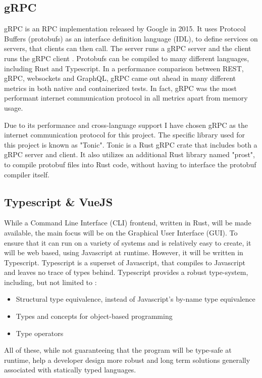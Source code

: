\subsection{gRPC} \label{sec:chapdesign:technology:grpc}
gRPC is an RPC implementation released by Google in 2015. It uses Protocol Buffers (protobufs) as an interface definition language (IDL), to define services on servers, that clients can then call. The server runs a gRPC server and the client runs the gRPC client \cite{grpcHomepage}. Protobufs can be compiled to many different languages, including Rust and Typescript. In a performance comparison between REST, gRPC, websockets and GraphQL, gRPC came out ahead in many different metrics \cite{reviewOfInternetProtocols} in both native and containerized tests. In fact, gRPC was the most performant internet communication protocol in all metrics apart from memory usage.

Due to its performance and cross-language support I have chosen gRPC as the internet communication protocol for this project. The specific library used for this project is known as "Tonic". Tonic is a Rust gRPC crate that includes both a gRPC server and client. It also utilizes an additional Rust library named "prost", to compile protobuf files into Rust code, without having to interface the protobuf compiler itself. 

\subsection{Typescript \& VueJS} \label{sec:chapdesign:technology:ts}
While a Command Line Interface (CLI) frontend, written in Rust, will be made available, the main focus will be on the Graphical User Interface (GUI). To ensure that it can run on a variety of systems and is relatively easy to create, it will be web based, using Javascript at runtime. However, it will be written in Typescript. Typescript is a superset of Javascript, that compiles to Javascript and leaves no trace of types behind. Typescript provides a robust type-system, including, but not limited to \cite{understandingTypescript}:
\begin{itemize}
    \item Structural type equivalence, instead of Javascript's by-name type equivalence
    \item Types and concepts for object-based programming
    \item Type operators
\end{itemize}
All of these, while not guaranteeing that the program will be type-safe at runtime, help a developer design more robust and long term solutions generally associated with statically typed languages.

